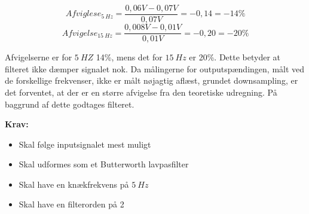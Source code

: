 \begin{equation} \label{equ:afvigelse1}
Afviglese_{5~Hz} = \frac{0,06V-0,07V}{0,07V} = -0,14  = - 14 \%
\end{equation}
\begin{equation} \label{equ:afvigelse2}
Afvigelse_{15~Hz} = \frac{0,008V-0,01V}{0,01V} = -0,20  = -20 \%
\end{equation}

\noindent 
Afvigelserne er for $5~HZ$ 14\%, mens det for $15~Hz$ er 20\%. Dette betyder at filteret ikke dæmper signalet nok. Da målingerne for outputspændingen, målt ved de forskellige frekvenser, ikke er målt nøjagtig aflæst, grundet downsampling, er det forventet, at der er en større afvigelse fra den teoretiske udregning. På baggrund af dette godtages filteret. 

\textbf{Krav:}
\begin{itemize}
\item[\text{\sffamily \checkmark}] Skal følge inputsignalet mest muligt  
\item[\text{\sffamily \checkmark}] Skal udformes som et Butterworth lavpasfilter
\item[\text{\sffamily \checkmark}] Skal have en knækfrekvens på $5~Hz$
\item[\text{\sffamily \checkmark}] Skal have en filterorden på 2
\end{itemize}